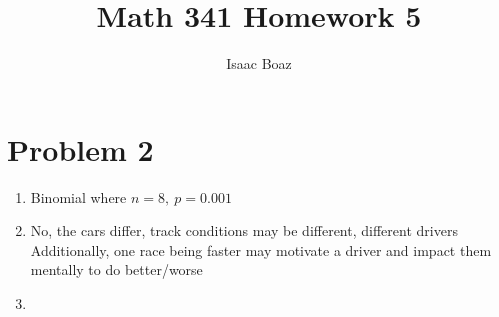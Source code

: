 \documentclass{article}
\title{Math 341 Homework 5}
\author{Isaac Boaz}
\begin{document}
\maketitle

\section*{Problem 2}
\begin{enumerate}[label=\alph*)]
    \item Binomial where \(n = 8,\ p = 0.001\)
    \item No, the cars differ, track conditions may be different, different drivers
          Additionally, one race being faster may motivate a driver and impact them mentally to do better/worse
    \item
\end{enumerate}
\end{document}
